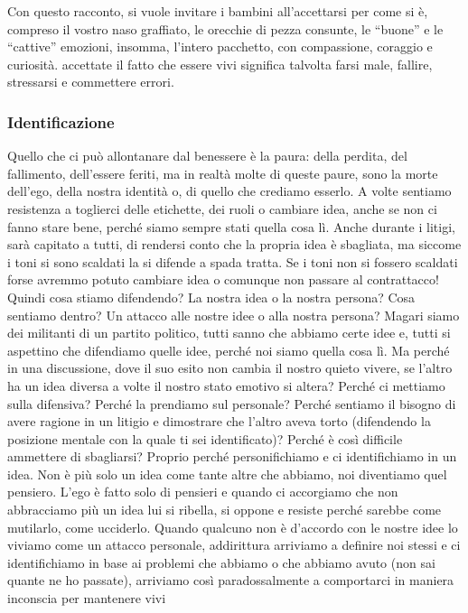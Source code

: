\documentclass[12pt]{book} %
\begin{document}
Con questo racconto, si vuole invitare i bambini all'accettarsi per come si è, compreso il vostro
naso graffiato, le orecchie di pezza consunte, le “buone” e le “cattive” emozioni, insomma,
l'intero pacchetto, con compassione, coraggio e curiosità. accettate il fatto che essere vivi
significa talvolta farsi male, fallire, stressarsi e commettere errori. 

\subsubsection{Identificazione}
Quello che ci può allontanare dal benessere è la paura: della perdita, del fallimento,
dell'essere feriti, ma in realtà molte di queste paure, sono la morte dell'ego, della nostra identità o, di quello che crediamo esserlo. A volte sentiamo
resistenza a toglierci delle etichette, dei ruoli o cambiare idea, anche se non ci fanno stare bene, perché siamo
sempre stati quella cosa lì. Anche durante i litigi, sarà capitato a tutti, di rendersi conto che la propria idea è
sbagliata, ma siccome i toni si sono scaldati la si difende a spada tratta. Se i toni non si fossero scaldati forse
avremmo potuto cambiare idea o comunque non passare al contrattacco! Quindi cosa stiamo difendendo? La nostra idea o la
nostra persona? Cosa sentiamo dentro? Un attacco alle nostre idee o alla nostra persona? Magari siamo dei militanti di
un partito politico, tutti sanno che abbiamo certe idee e, tutti si aspettino che difendiamo quelle idee, perché noi
siamo quella cosa lì. Ma perché in una discussione, dove il suo esito non cambia il nostro quieto vivere, se
l'altro ha un idea diversa a volte il nostro stato emotivo si altera? Perché ci mettiamo sulla
difensiva? Perché la prendiamo sul personale? Perché sentiamo il bisogno di avere ragione in un litigio e dimostrare
che l'altro aveva torto (difendendo la posizione mentale con la quale ti sei identificato)? Perché
è così difficile ammettere di sbagliarsi? Proprio perché personifichiamo e ci identifichiamo in un idea. Non è più solo
un idea come tante altre che abbiamo, noi diventiamo quel pensiero. L'ego è fatto solo di pensieri
e quando ci accorgiamo che non abbracciamo più un idea lui si ribella, si oppone e resiste perché sarebbe come
mutilarlo, come ucciderlo. Quando qualcuno non è d'accordo con le nostre idee lo viviamo come un attacco personale,
addirittura arriviamo a definire noi stessi e ci identifichiamo in base ai problemi che abbiamo o che abbiamo avuto
(non sai quante ne ho passate), arriviamo così paradossalmente a comportarci in maniera inconscia per mantenere vivi
\end{document}
